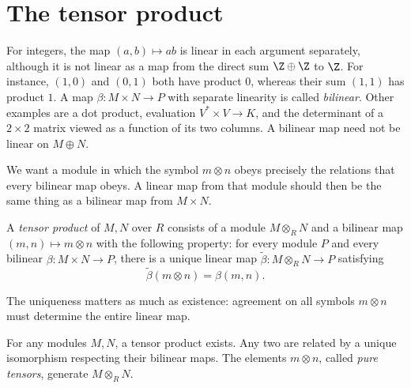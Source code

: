 \section{The tensor product}

For integers, the map $(a,b)\mapsto ab$ is linear in each argument separately, although it is not linear as a map from the direct sum $\Z\oplus\Z$ to $\Z$. For instance, $(1,0)$ and $(0,1)$ both have product $0$, whereas their sum $(1,1)$ has product $1$. A map $\beta\colon M\times N\to P$ with separate linearity is called \emph{bilinear}. Other examples are a dot product, evaluation $V^*\times V\to K$, and the determinant of a $2\times2$ matrix viewed as a function of its two columns. A bilinear map need not be linear on $M\oplus N$.

We want a module in which the symbol $m\otimes n$ obeys precisely the relations that every bilinear map obeys. A linear map from that module should then be the same thing as a bilinear map from $M\times N$.

\begin{definition}\label{def:tensor}
A \emph{tensor product} of $M,N$ over $R$ consists of a module $M\otimes_RN$ and a bilinear map $(m,n)\mapsto m\otimes n$ with the following property: for every module $P$ and every bilinear $\beta\colon M\times N\to P$, there is a unique linear map $\tilde\beta\colon M\otimes_RN\to P$ satisfying
\[
\tilde\beta(m\otimes n)=\beta(m,n).
\]
\end{definition}

The uniqueness matters as much as existence: agreement on all symbols $m\otimes n$ must determine the entire linear map.

\begin{theorem}\label{thm:tensorexists}
For any modules $M,N$, a tensor product exists. Any two are related by a unique isomorphism respecting their bilinear maps. The elements $m\otimes n$, called \emph{pure tensors}, generate $M\otimes_RN$.
\end{theorem}

